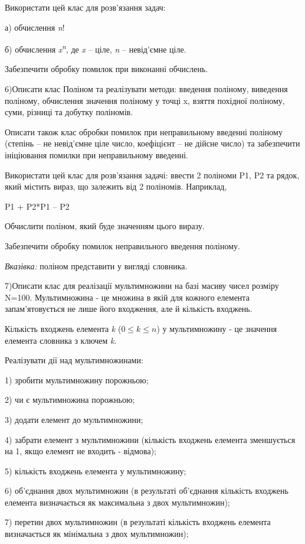 \documentclass[]{article}
\makeatletter
\newcommand{\xslalph}[1]{\expandafter\@xslalph\csname c@#1\endcsname}
\newcommand{\@xslalph}[1]{%
    \ifcase#1\or а\or б\or в\or г\or д\or e\or є\or ж\or з\or i%
    \or й\or к\or л\or м\or н\or о\or п\or р\or с\or т%
    \or у\or ф\or х\or ц\or ч\or ш\or ю\or я\or аа\or бб\or вв%
    \else\@ctrerr\fi%
}
\makeatother
\begin{document}
\begin{enumerate}
\begin{enumerate}[label=\xslalph*)]
\begin{enumerate}
\begin{enumerate}[label=\xslalph*)]
\begin{enumerate}
\begin{enumerate}[label=\xslalph*)]
\begin{enumerate}
\begin{enumerate}[label=\xslalph*)]
Використати цей клас для розв'язання задач:

а) обчислення \emph{n}!

б) обчислення \emph{x\textsuperscript{n}}, де \emph{x} -- ціле, \emph{n}
-- невід'ємне ціле.

Забезпечити обробку помилок при виконанні обчислень.

6)Описати клас Поліном та реалізувати методи: введення поліному,
виведення поліному, обчислення значення поліному у точці x, взяття
похідної поліному, суми, різниці та добутку поліномів.

Описати також клас обробки помилок при неправильному введенні поліному
(степінь -- не невід'ємне ціле число, коефіцієнт -- не дійсне число) та
забезпечити ініціювання помилки при неправильному введенні.

Використати цей клас для розв'язання задачі: ввести 2 поліноми P1, P2 та
рядок, який містить вираз, що залежить від 2 поліномів. Наприклад,

P1 + P2*P1 -- P2

Обчислити поліном, який буде значенням цього виразу.

Забезпечити обробку помилок неправильного введення поліному.

\emph{\emph{Вказівка:}} поліном представити у вигляді словника.

7)Описати клас для реалізації мультимножини на базі масиву чисел розміру
N=100. Мультимножина - це множина в якій для кожного елемента
запам'ятовується не лише його входження, але й кількість входжень.

Кількість входжень елемента \emph{k} (\(0 \leq k \leq n\)) у
мультимножину - це значення елемента словника з ключем \emph{k}.

Реалізувати дії над мультимножинами:

1) зробити мультимножину порожньою;

2) чи є мультимножина порожньою;

3) додати елемент до мультимножини;

4) забрати елемент з мультимножини (кількість входжень елемента
зменшується на 1, якщо елемент не входить - відмова);

5) кількість входжень елемента у мультимножину;

6) об'єднання двох мультимножин (в результаті об'єднання кількість
входжень елемента визначається як максимальна з двох мультимножин);

7) перетин двох мультимножин (в результаті кількість входжень елемента
визначається як мінімальна з двох мультимножин);


\end{enumerate}
\end{enumerate}
\end{enumerate}
\end{enumerate}
\end{enumerate}
\end{enumerate}
\end{enumerate}
\end{enumerate}
\end{document}
